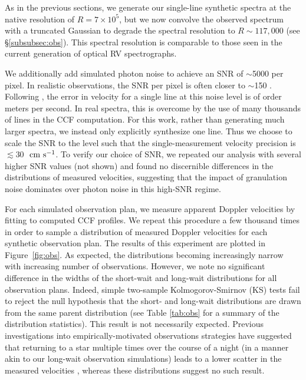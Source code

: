 \documentclass[twocolumn]{aastex63}
\newcommand{\cms}{\ {\rm cm\ s}^{-1}}
\newcommand{\revise}[1]{#1}
\newcommand{\revisetwo}[1]{#1}
\begin{document}
As in the previous sections, we generate our single-line synthetic spectra at the native resolution of $R=7\times10^{5}$, but we now convolve the observed spectrum with a truncated Gaussian to degrade the spectral resolution to $R \sim 117,000$ (see \S\ref{subsubsec:obs}). This spectral resolution is comparable to those seen in the current generation of optical RV spectrographs. \par 

We additionally add simulated photon noise to achieve an SNR of \revise{$\sim$5000} per pixel. In realistic observations, the SNR per pixel is often closer to $\sim$150 \citep{Gupta2021}. Following \citet{Murphy2007}, the error in velocity for a single line at this noise level is of order meters per second. In real spectra, this is overcome by the use of many thousands of lines in the CCF computation. For this work, rather than generating much larger spectra, we instead only explicitly synthesize one line. Thus we choose to scale the SNR to the level such that the single-measurement velocity precision is \revise{$\lesssim$30 $\cms$}. To verify our choice of SNR, we repeated our analysis with several higher SNR values (not shown) and found no discernible differences in the distributions of measured velocities, suggesting that the impact of granulation noise dominates over photon noise in this high-SNR regime. \par

For each simulated observation plan, we measure apparent Doppler velocities by fitting to computed CCF profiles. We repeat this procedure \revisetwo{a few thousand times} in order to sample a distribution of measured Doppler velocities for each synthetic observation plan. The results of this experiment are plotted in Figure~\ref{fig:obs}. As expected, the distributions becoming increasingly narrow with increasing number of observations. \revisetwo{However, we note no significant difference in the widths of the short-wait and long-wait distributions for all observation plans. Indeed, simple two-sample Kolmogorov-Smirnov (KS) tests fail to reject the null hypothesis that the short- and long-wait distributions are drawn from the same parent distribution (see Table \ref{tab:obs} for a summary of the distribution statistics).} This result is not necessarily expected. Previous investigations into empirically-motivated observations strategies have suggested that returning to a star multiple times over the course of a night \revisetwo{(in a manner akin to our long-wait observation simulations)} leads \revisetwo{to a lower scatter in the measured velocities} \citep[e.g.,][]{Dumusque2011, Meunier2015, CollierCameron2019}\revisetwo{, whereas these distributions suggest no such result.} \par 
\end{document}
